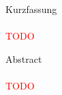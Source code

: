 
{\huge Kurzfassung}
\\
\\

\textcolor{red}{TODO}
\newpage


{\huge Abstract}
\\
\\

\textcolor{red}{TODO}

\newpage